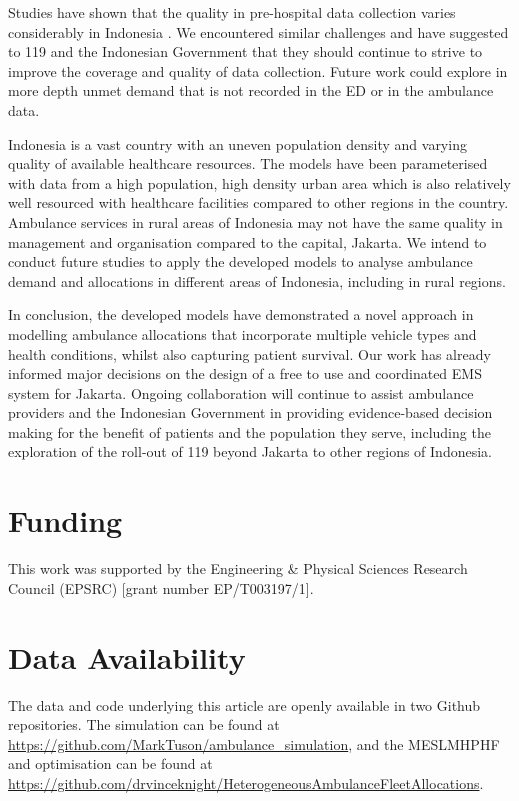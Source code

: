 \documentclass[numbers,webpdf,imaman]{ima-authoring-template}%
\begin{document}
Studies have shown that the quality in pre-hospital data collection varies
considerably in Indonesia \citep{hooper2019_datacollection}. We encountered
similar challenges and have suggested to 119 and the Indonesian Government
that they should continue to strive to improve the coverage and quality of
data collection. Future work could explore in more depth unmet demand that is
not recorded in the ED or in the ambulance data.

Indonesia is a vast country with an uneven population density and varying
quality of available healthcare resources. The models have been parameterised
with data from a high population, high density urban area which is also
relatively well resourced with healthcare facilities compared to other regions
in the country. Ambulance services in rural areas of Indonesia may not have
the same quality in management and organisation compared to the capital,
Jakarta. We intend to conduct future studies to apply the developed models to
analyse ambulance demand and allocations in different areas of Indonesia,
including in rural regions.

In conclusion, the developed models have demonstrated a novel approach in
modelling ambulance allocations that incorporate multiple vehicle types and
health conditions, whilst also capturing patient survival. Our work has
already informed major decisions on the design of a free to use and
coordinated EMS system for Jakarta. Ongoing collaboration will continue to
assist ambulance providers and the Indonesian Government in providing
evidence-based decision making for the benefit of patients and the population
they serve, including the exploration of the roll-out of 119 beyond Jakarta to
other regions of Indonesia. 


\section*{Funding}
This work was supported by the Engineering \& Physical Sciences Research Council
(EPSRC) [grant number EP/T003197/1].


\section*{Data Availability}
The data and code underlying this article are openly available in two Github repositories. The simulation can be found at \url{https://github.com/MarkTuson/ambulance_simulation}, and the MESLMHPHF and optimisation can be found at \url{https://github.com/drvinceknight/HeterogeneousAmbulanceFleetAllocations}.
\end{document}
